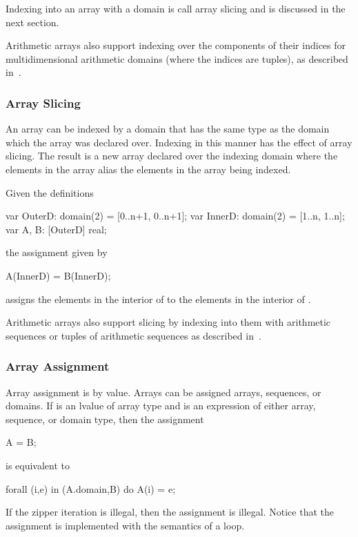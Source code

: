 Indexing into an array with a domain is call array slicing and is
discussed in the next section.

Arithmetic arrays also support indexing over the components of their
indices for multidimensional arithmetic domains (where the indices are
tuples), as described in~.

\subsubsection{Array Slicing}
\label{Array_Slicing}

An array can be indexed by a domain that has the same type as the
domain which the array was declared over.  Indexing in this manner has
the effect of array slicing.  The result is a new array declared over
the indexing domain where the elements in the array alias the elements
in the array being indexed.

\begin{example}
Given the definitions
\begin{chapel}
var OuterD: domain(2) = [0..n+1, 0..n+1];
var InnerD: domain(2) = [1..n, 1..n];
var A, B: [OuterD] real;
\end{chapel}
the assignment given by
\begin{chapel}
A(InnerD) = B(InnerD);
\end{chapel}
assigns the elements in the interior of  to the elements in
the interior of .
\end{example}

Arithmetic arrays also support slicing by indexing into them with
arithmetic sequences or tuples of arithmetic sequences as described
in~.

\subsubsection{Array Assignment}
\label{Array_Assignment}

Array assignment is by value.  Arrays can be assigned arrays,
sequences, or domains.  If  is an lvalue of array type
and  is an expression of either array, sequence, or domain
type, then the assignment
\begin{chapel}
A = B;
\end{chapel}
is equivalent to
\begin{chapel}
forall (i,e) in (A.domain,B) do
  A(i) = e;
\end{chapel}
If the zipper iteration is illegal, then the assignment is illegal.
Notice that the assignment is implemented with the semantics of
a  loop.

